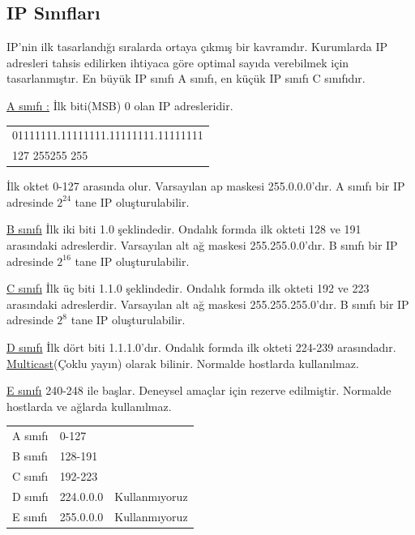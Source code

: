 \subsection{IP Sınıfları}
IP'nin ilk tasarlandığı sıralarda ortaya çıkmış bir kavramdır. Kurumlarda IP adresleri tahsis edilirken ihtiyaca göre optimal sayıda verebilmek için tasarlanmıştır. En büyük IP sınıfı A sınıfı, en küçük IP sınıfı C sınıfıdır. 

\underline{A sınıfı :} İlk biti(MSB) 0 olan IP adresleridir. 

\begin{tabular}{l}
01111111.11111111.11111111.11111111 \\
  127  \hspace{1.1cm} 255\hspace{1.1cm}255\hspace{1.1cm} 255 \\
\end{tabular}

İlk oktet 0-127 arasında olur. Varsayılan ap maskesi 255.0.0.0'dır. A sınıfı bir IP adresinde $2^{24}$ tane IP oluşturulabilir.

\underline{B sınıfı} İlk iki biti 1.0 şeklindedir. Ondalık formda ilk  okteti 128 ve 191 arasındaki adreslerdir. Varsayılan alt ağ maskesi 255.255.0.0'dır. B sınıfı bir IP adresinde $2^{16}$ tane IP oluşturulabilir.


\underline{C sınıfı} İlk üç biti 1.1.0 şeklindedir. Ondalık formda ilk okteti 192 ve 223 arasındaki adreslerdir. Varsayılan alt ağ maskesi 255.255.255.0'dır. B sınıfı bir IP adresinde $2^{8}$ tane IP oluşturulabilir.

\underline{D sınıfı} İlk dört biti 1.1.1.0'dır. Ondalık formda ilk okteti 224-239 arasındadır. \underline{Multicast}(Çoklu yayın) olarak bilinir. Normalde hostlarda kullanılmaz. 

\underline{E sınıfı} 240-248 ile başlar. Deneysel amaçlar için rezerve edilmiştir. Normalde hostlarda ve ağlarda kullanılmaz.

\begin{tabular}{lll}
A sınıfı & 0-127 & \\
B sınıfı & 128-191 & \\
C sınıfı & 192-223 & \\
D sınıfı & 224.0.0.0 \vline & Kullanmıyoruz \\
E sınıfı & 255.0.0.0 \vline  &Kullanmıyoruz \\
\end{tabular} 

